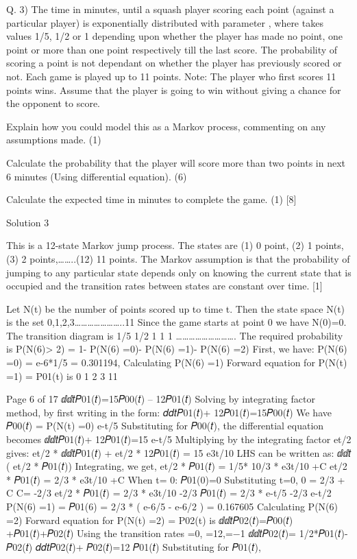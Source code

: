 Q. 3)
The time in minutes, until a squash player scoring each point (against a particular player) is exponentially distributed with parameter \lambda, where \lambda takes values 1/5, 1/2 or 1 depending upon whether the player has made no point, one point or more than one point respectively till the last score. The probability of scoring a point is not dependant on whether the player has previously scored or not. Each game is played up to 11 points.
Note: The player who first scores 11 points wins. Assume that the player is going to win without giving a chance for the opponent to score.
\item Explain how you could model this as a Markov process, commenting on any assumptions made.
(1)
\item Calculate the probability that the player will score more than two points in next 6 minutes (Using differential equation).
(6)
\item Calculate the expected time in minutes to complete the game.
(1)
[8]

Solution 3
\item
This is a 12-state Markov jump process. The states are (1) 0 point, (2) 1 points, (3) 2 points,……..(12) 11 points.
The Markov assumption is that the probability of jumping to any particular state depends only on knowing the current state that is occupied and the transition rates between states are constant over time.
[1]
\item
Let N(t) be the number of points scored up to time t. Then the state space N(t) is the set {0,1,2,3…………………..11}
Since the game starts at point 0 we have N(0)=0.
The transition diagram is
1/5 1/2 1 1 1
……………………….
The required probability is
P(N(6)> 2) = 1- P(N(6) =0)- P(N(6) =1)- P(N(6) =2)
First, we have:
P(N(6) =0) = e-6*1/5 = 0.301194,
Calculating P(N(6) =1)
Forward equation for P(N(t) =1) = P01(t) is
0
1
2
3
11

Page 6 of 17
ⅆⅆ𝑡𝑃01(𝑡)=15𝑃00(𝑡) – 12𝑃01(𝑡)
Solving by integrating factor method, by first writing in the form:
𝑑𝑑𝑡𝑃01(𝑡)+ 12𝑃01(𝑡)=15𝑃00(𝑡)
We have 𝑃00(𝑡) = P(N(t) =0) e-t/5
Substituting for 𝑃00(𝑡), the differential equation becomes
ⅆⅆ𝑡𝑃01(𝑡)+ 12𝑃01(𝑡)=15 e-t/5
Multiplying by the integrating factor et/2 gives:
et/2 * ⅆⅆ𝑡𝑃01(𝑡) + et/2 * 12𝑃01(𝑡) = 15 e3t/10
LHS can be written as:
ⅆⅆ𝑡 ( et/2 * 𝑃01(𝑡))
Integrating, we get,
et/2 * 𝑃01(𝑡) = 1/5* 10/3 * e3t/10 +C
et/2 * 𝑃01(𝑡) = 2/3 * e3t/10 +C
When t= 0: 𝑃01(0)=0
Substituting t=0,
0 = 2/3 + C
C= -2/3
et/2 * 𝑃01(𝑡) = 2/3 * e3t/10 -2/3
𝑃01(𝑡) = 2/3 * e-t/5 -2/3 e-t/2
P(N(6) =1) = 𝑃01(6) = 2/3 * ( e-6/5 - e-6/2 ) = 0.167605
Calculating P(N(6) =2)
Forward equation for P(N(t) =2) = P02(t) is
ⅆⅆ𝑡𝑃02(𝑡)=𝑃00(𝑡) +𝑃01(𝑡)+𝑃02(𝑡)
Using the transition rates =0, =12,=−1
ⅆⅆ𝑡𝑃02(𝑡)= 1/2*𝑃01(𝑡)-𝑃02(𝑡)
𝑑𝑑𝑡𝑃02(𝑡)+ 𝑃02(𝑡)=12 𝑃01(𝑡)
Substituting for 𝑃01(𝑡),

